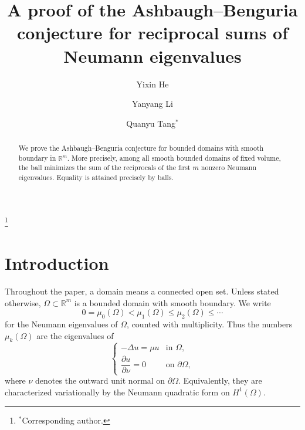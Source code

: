 \documentclass[11pt,letterpaper,reqno]{amsart}
\theoremstyle{definition}
\begin{document}
\title[A proof of the Ashbaugh--Benguria conjecture]{A proof of the Ashbaugh--Benguria conjecture for reciprocal sums of Neumann eigenvalues}


\author[Y.~He]{Yixin He}
\address{School of Mathematical Sciences, Fudan University, Shanghai 200433, P. R. China}

\author[Y.~Li]{Yanyang Li}
\address{School of Mathematics, Southeast University, Nanjing 211189, P. R. China}

\author[Q.~Tang]{Quanyu Tang${}^\ast$}
\thanks{${}^\ast$Corresponding author.}
\address{School of Mathematics and Statistics, Xi'an Jiaotong University, Xi'an 710049, P. R. China}





\begin{abstract}
We prove the Ashbaugh--Benguria conjecture for bounded domains with
smooth boundary in $\mathbb R^m$. More precisely, among all smooth bounded domains of fixed volume, the ball minimizes the sum of the reciprocals of the first $m$ nonzero Neumann eigenvalues. Equality is attained precisely by balls.
\end{abstract}





\maketitle

\section{Introduction}

Throughout the paper, a domain means a connected open set. Unless stated
otherwise, \(\Omega\subset\mathbb R^m\) is a bounded domain with smooth
boundary. We write
\[
        0=\mu_0(\Omega)<\mu_1(\Omega)\leq\mu_2(\Omega)\leq\cdots
\]
for the Neumann eigenvalues of \(\Omega\), counted with multiplicity. Thus the numbers \(\mu_k(\Omega)\) are the eigenvalues of
\[
\begin{cases}
        -\Delta u=\mu u & \text{in }\Omega,\\
        \dfrac{\partial u}{\partial\nu}=0 & \text{on }\partial\Omega,
\end{cases}
\]
where \(\nu\) denotes the outward unit normal on \(\partial\Omega\). Equivalently, they are characterized variationally by the Neumann quadratic form on \(H^1(\Omega)\).
\end{document}
